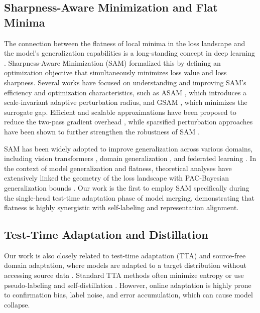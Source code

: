 \documentclass{article}
\theoremstyle{plain}
\theoremstyle{definition}
\theoremstyle{remark}
\begin{document}
\subsection{Sharpness-Aware Minimization and Flat Minima}
The connection between the flatness of local minima in the loss landscape and the model's generalization capabilities is a long-standing concept in deep learning \cite{hochreiter1997flat, keskar2016on}. Sharpness-Aware Minimization (SAM) \cite{foret2020sharpness} formalized this by defining an optimization objective that simultaneously minimizes loss value and loss sharpness. Several works have focused on understanding and improving SAM's efficiency and optimization characteristics, such as ASAM \cite{kwon2021asam}, which introduces a scale-invariant adaptive perturbation radius, and GSAM \cite{andriushchenko2022towards}, which minimizes the surrogate gap. Efficient and scalable approximations have been proposed to reduce the two-pass gradient overhead \cite{du2021efficient, liu2022towards}, while sparsified perturbation approaches have been shown to further strengthen the robustness of SAM \cite{mi2022make}.

SAM has been widely adopted to improve generalization across various domains, including vision transformers \cite{dosovitskiy2020image}, domain generalization \cite{cha2021swad}, and federated learning \cite{qu2022generalized, fan2024locally}. In the context of model generalization and flatness, theoretical analyses have extensively linked the geometry of the loss landscape with PAC-Bayesian generalization bounds \cite{mcallester1999pac, neyshabur2017exploring, bartlett2017spectrally, jiang2019fantastic, dziugaite2017computing}. Our work is the first to employ SAM specifically during the single-head test-time adaptation phase of model merging, demonstrating that flatness is highly synergistic with self-labeling and representation alignment.

\subsection{Test-Time Adaptation and Distillation}
Our work is also closely related to test-time adaptation (TTA) and source-free domain adaptation, where models are adapted to a target distribution without accessing source data \cite{wang2020tent, liang2020source, zhang2022memo}. Standard TTA methods often minimize entropy \cite{wang2020tent} or use pseudo-labeling and self-distillation \cite{liang2020source}. However, online adaptation is highly prone to confirmation bias, label noise, and error accumulation, which can cause model collapse.
\end{document}
